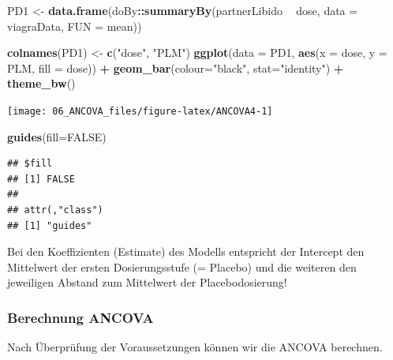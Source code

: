 \documentclass[]{article}
\newenvironment{Shaded}{\begin{snugshade}}{\end{snugshade}}
\newcommand{\DataTypeTok}[1]{\textcolor[rgb]{0.13,0.29,0.53}{#1}}
\newcommand{\KeywordTok}[1]{\textcolor[rgb]{0.13,0.29,0.53}{\textbf{#1}}}
\newcommand{\NormalTok}[1]{#1}
\newcommand{\OperatorTok}[1]{\textcolor[rgb]{0.81,0.36,0.00}{\textbf{#1}}}
\newcommand{\OtherTok}[1]{\textcolor[rgb]{0.56,0.35,0.01}{#1}}
\newcommand{\StringTok}[1]{\textcolor[rgb]{0.31,0.60,0.02}{#1}}
\begin{document}
\begin{Shaded}
\begin{Highlighting}[]
\NormalTok{  PD1 <-}\StringTok{ }\KeywordTok{data.frame}\NormalTok{(doBy}\OperatorTok{::}\KeywordTok{summaryBy}\NormalTok{(partnerLibido }\OperatorTok{~}\StringTok{ }\NormalTok{dose, }\DataTypeTok{data =}\NormalTok{ viagraData, }\DataTypeTok{FUN =}\NormalTok{ mean))}

  \KeywordTok{colnames}\NormalTok{(PD1) <-}\StringTok{ }\KeywordTok{c}\NormalTok{(}\StringTok{"dose"}\NormalTok{, }\StringTok{"PLM"}\NormalTok{)}
  \KeywordTok{ggplot}\NormalTok{(}\DataTypeTok{data =}\NormalTok{ PD1, }\KeywordTok{aes}\NormalTok{(}\DataTypeTok{x =}\NormalTok{ dose, }\DataTypeTok{y =}\NormalTok{ PLM, }\DataTypeTok{fill =}\NormalTok{ dose)) }\OperatorTok{+}
\StringTok{    }\KeywordTok{geom_bar}\NormalTok{(}\DataTypeTok{colour=}\StringTok{"black"}\NormalTok{, }\DataTypeTok{stat=}\StringTok{"identity"}\NormalTok{) }\OperatorTok{+}
\StringTok{    }\KeywordTok{theme_bw}\NormalTok{()}
\end{Highlighting}
\end{Shaded}

\begin{center}\texttt{[image: 06\_ANCOVA\_files/figure-latex/ANCOVA4-1]} \end{center}

\begin{Shaded}
\begin{Highlighting}[]
    \KeywordTok{guides}\NormalTok{(}\DataTypeTok{fill=}\OtherTok{FALSE}\NormalTok{)    }
\end{Highlighting}
\end{Shaded}

\begin{verbatim}
## $fill
## [1] FALSE
## 
## attr(,"class")
## [1] "guides"
\end{verbatim}

Bei den Koeffizienten (Estimate) des Modells entspricht der Intercept den Mittelwert der ersten Dosierungsstufe (= Placebo) und die weiteren den jeweiligen Abstand zum Mittelwert der Placebodosierung!

\hypertarget{berechnung-ancova}{%
\subsubsection*{Berechnung ANCOVA}\label{berechnung-ancova}}

Nach Überprüfung der Voraussetzungen können wir die ANCOVA berechnen.
\end{document}
